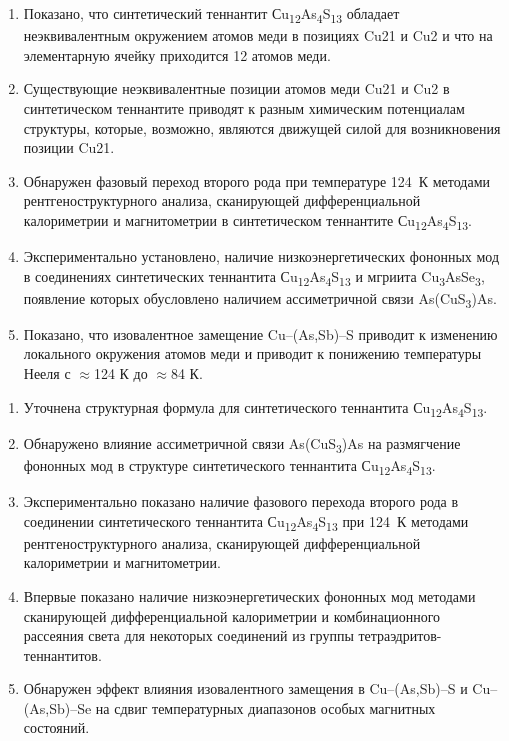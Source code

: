 \begin{enumerate}
\item Показано, что синтетический теннантит Сu\textsubscript{12}As\textsubscript{4}S\textsubscript{13} обладает неэквивалентным  окружением атомов меди в позициях Cu21 и Cu2 и что на элементарную ячейку приходится 12 атомов меди.
\item Существующие неэквивалентные позиции атомов меди Cu21 и Cu2 в синтетическом теннантите приводят к разным химическим потенциалам структуры, которые, возможно, являются движущей силой для возникновения позиции Cu21.
\item Обнаружен фазовый переход второго рода при температуре 124~К методами рентгеноструктурного анализа, сканирующей дифференциальной калориметрии и магнитометрии  в синтетическом теннантите Сu\textsubscript{12}As\textsubscript{4}S\textsubscript{13}.
\item Экспериментально установлено, наличие низкоэнергетических фононных мод в соединениях синтетических теннантита Сu\textsubscript{12}As\textsubscript{4}S\textsubscript{13} и мгриита Cu\textsubscript{3}AsSe\textsubscript{3}, появление которых обусловлено наличием ассиметричной связи As(CuS\textsubscript{3})As.
\item Показано, что изовалентное замещение Cu--(As,Sb)--S приводит к изменению локального окружения атомов меди и приводит к понижению температуры Нееля с $\approx$124 К до $\approx$84 К.

\end{enumerate}

\novelty
\begin{enumerate}
\item Уточнена структурная формула для синтетического теннантита Сu\textsubscript{12}As\textsubscript{4}S\textsubscript{13}.
\item  Обнаружено влияние ассиметричной связи As(CuS\textsubscript{3})As на размягчение фононных мод в структуре синтетического теннантита Сu\textsubscript{12}As\textsubscript{4}S\textsubscript{13}.
\item Экспериментально показано наличие фазового перехода второго рода в соединении  синтетического теннантита Сu\textsubscript{12}As\textsubscript{4}S\textsubscript{13} при 124~К методами рентгеноструктурного анализа, сканирующей дифференциальной калориметрии и магнитометрии.
\item Впервые показано наличие низкоэнергетических фононных мод методами сканирующей дифференциальной калориметрии и комбинационного рассеяния света для некоторых соединений из группы тетраэдритов-теннантитов.
\item Обнаружен эффект влияния изовалентного замещения в Cu--(As,Sb)--S и  Cu--(As,Sb)--Se на сдвиг температурных диапазонов  особых магнитных состояний.
\end{enumerate}

